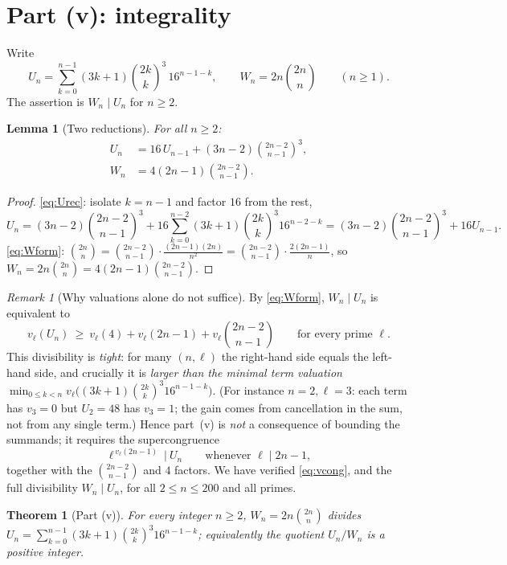 \documentclass[12pt]{article}
\newtheorem{theorem}{Theorem}
\newtheorem{lemma}{Lemma}
\theoremstyle{remark}
\newtheorem{remark}{Remark}
\newcommand{\bin}[2]{\binom{#1}{#2}}
\begin{document}
\section{Part (v): integrality}

Write
\[
U_n=\sum_{k=0}^{n-1}(3k+1)\bin{2k}{k}^3\,16^{n-1-k},\qquad
W_n=2n\bin{2n}{n}\qquad(n\ge1).
\]
The assertion is $W_n\mid U_n$ for $n\ge2$.

\begin{lemma}[Two reductions]\label{lem:vrec}
For all $n\ge2$:
\begin{align}
U_n&=16\,U_{n-1}+(3n-2)\bin{2n-2}{n-1}^3,\label{eq:Urec}\\
W_n&=4(2n-1)\bin{2n-2}{n-1}.\label{eq:Wform}
\end{align}
\end{lemma}

\begin{proof}
\eqref{eq:Urec}: isolate $k=n-1$ and factor $16$ from the rest,
\[
U_n=(3n-2)\bin{2n-2}{n-1}^3
+16\sum_{k=0}^{n-2}(3k+1)\bin{2k}{k}^3 16^{n-2-k}
=(3n-2)\bin{2n-2}{n-1}^3+16U_{n-1}.
\]
\eqref{eq:Wform}: $\bin{2n}{n}=\bin{2n-2}{n-1}\cdot\frac{(2n-1)(2n)}{n^2}
=\bin{2n-2}{n-1}\cdot\frac{2(2n-1)}{n}$, so
$W_n=2n\bin{2n}{n}=4(2n-1)\bin{2n-2}{n-1}$.
\end{proof}

\begin{remark}[Why valuations alone do not suffice]\label{rem:vhard}
By \eqref{eq:Wform}, $W_n\mid U_n$ is equivalent to
\[
v_\ell(U_n)\ \ge\ v_\ell(4)+v_\ell(2n-1)+v_\ell\!\bin{2n-2}{n-1}
\qquad\text{for every prime }\ell .
\]
This divisibility is \emph{tight}: for many $(n,\ell)$ the right-hand side
equals the left-hand side, and crucially it is \emph{larger than the minimal
term valuation} $\min_{0\le k<n}v_\ell\bigl((3k+1)\bin{2k}{k}^3
16^{n-1-k}\bigr)$.  (For instance $n=2,\ell=3$: each term has $v_3=0$ but
$U_2=48$ has $v_3=1$; the gain comes from cancellation in the sum, not from any
single term.)  Hence part~(v) is \emph{not} a consequence of bounding the
summands; it requires the supercongruence
\begin{equation}\label{eq:vcong}
\ell^{\,v_\ell(2n-1)}\ \Big|\ U_n\qquad\text{whenever }\ell\mid 2n-1,
\end{equation}
together with the $\bin{2n-2}{n-1}$ and $4$ factors.  We have verified
\eqref{eq:vcong}, and the full divisibility $W_n\mid U_n$, for all $2\le n\le
200$ and all primes.
\end{remark}

\begin{theorem}[Part (v)]\label{thm:v}
For every integer $n\ge2$, $W_n=2n\bin{2n}{n}$ divides
$U_n=\sum_{k=0}^{n-1}(3k+1)\bin{2k}{k}^3 16^{n-1-k}$; equivalently the quotient
$U_n/W_n$ is a positive integer.
\end{theorem}
\end{document}
